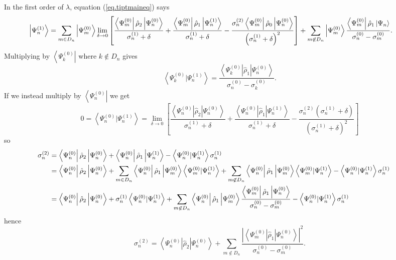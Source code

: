 \documentclass[11pt]{article}
\newcommand{\bra}[1]{\left\langle#1\right|}
\newcommand{\ket}[1]{\left|#1\right\rangle}
\newcommand{\braket}[2]{\left\langle#1|#2\right\rangle}
\newcommand{\op}[1]{\hat{#1}}
\theoremstyle{theorem}
\theoremstyle{remark}
\theoremstyle{step}
\theoremstyle{gap}
\begin{document}
In the first order of \(\lambda\), equation (\ref{eq.tiptmaineq}) says
\[
\hspace{-2.5em}
\ket{\Psi_n^{(1)}} = \sum_{m \in D_n} \ket{\Psi_m^{(0)}} \lim_{\delta \to 0}\left[\frac{\bra{\Psi_m^{(0)}}\op{\rho}_2\ket{\Psi_n^{(0)}}}{\sigma_n^{(1)} + \delta} + \frac{\bra{\Psi_m^{(0)}}\op{\rho}_1\ket{\Psi_n^{(1)}}}{\sigma_n^{(1)} + \delta} - \frac{\sigma_n^{(2)}\bra{\Psi_m^{(0)}}\op{\rho}_0\ket{\Psi_n^{(0)}}}{\left(\sigma_n^{(1)} + \delta\right)^2}\right] 
+ \sum_{m \not\in D_n} \ket{\Psi_m^{(0)}}\frac{\bra{\Psi_m^{(0)}} \op{\rho}_1 \ket{\Psi_n}}{\sigma_n^{(0)} - \sigma_m^{(0)}}.
\]
Multiplying by \(\bra{\Psi_k^{(0)}}\) where \(k \not\in D_n\) gives
\[
\braket{\Psi_k^{(0)}}{\Psi_n^{(1)}} = \frac{\bra{\Psi_k^{(0)}} \op{\rho}_1 \ket{\Psi_n^{(0)}}}{\sigma_n^{(0)}-\sigma_k^{(0)}}.
\]
If we instead multiply by \(\bra{\Psi_n^{(0)}}\) we get
\[
0 = \braket{\Psi_n^{(0)}}{\Psi_n^{(1)}} = \lim_{\delta \to 0} \left[\frac{\bra{\Psi_n^{(0)}}\op{\rho}_2\ket{\Psi_n^{(0)}}}{\sigma_n^{(1)} + \delta} + \frac{\bra{\Psi_n^{(0)}}\op{\rho}_1\ket{\Psi_n^{(1)}}}{\sigma_n^{(1)} + \delta} - \frac{\sigma_n^{(2)}\left(\sigma_n^{(1)}+\delta\right)}{\left(\sigma_n^{(1)} + \delta\right)^2}\right]
\]
so
\begin{align*}
\hspace{-2em}\sigma_n^{(2)} &= \bra{\Psi_n^{(0)}}\op{\rho}_2\ket{\Psi_n^{(0)}} + \bra{\Psi_n^{(0)}}\op{\rho}_1\ket{\Psi_n^{(1)}} - \braket{\Psi_n^{(0)}}{\Psi_n^{(1)}} \sigma_n^{(1)}\\
&= \bra{\Psi_n^{(0)}}\op{\rho}_2\ket{\Psi_n^{(0)}} + \sum_{m \in D_n} \bra{\Psi_n^{(0)}}\op{\rho}_1\ket{\Psi_m^{(0)}}\braket{\Psi_m^{(0)}}{\Psi_n^{(1)}} + \sum_{m \not\in D_n} \bra{\Psi_n^{(0)}}\op{\rho}_1\ket{\Psi_m^{(0)}}\braket{\Psi_m^{(0)}}{\Psi_n^{(1)}} - \braket{\Psi_n^{(0)}}{\Psi_n^{(1)}} \sigma_n^{(1)}\\
&= \bra{\Psi_n^{(0)}}\op{\rho}_2\ket{\Psi_n^{(0)}} + \sigma_n^{(1)}\braket{\Psi_n^{(0)}}{\Psi_n^{(1)}} +  \sum_{m \not\in D_n} \bra{\Psi_n^{(0)}}\op{\rho}_1\ket{\Psi_m^{(0)}}\frac{\bra{\Psi_m^{(0)}} \op{\rho}_1 \ket{\Psi_n^{(0)}}}{\sigma_n^{(0)}-\sigma_m^{(0)}}- \braket{\Psi_n^{(0)}}{\Psi_n^{(1)}} \sigma_n^{(1)}
\end{align*}
hence
\begin{equation}\label{eq.tipt.soval}
\boxed{\sigma_n^{(2)} = \bra{\Psi_n^{(0)}}\op{\rho}_2\ket{\Psi_n^{(0)}} +  \sum_{m \not\in D_n} \frac{\left|\bra{\Psi_m^{(0)}} \op{\rho}_1 \ket{\Psi_n^{(0)}}\right|^2}{\sigma_n^{(0)}-\sigma_m^{(0)}}.}
\end{equation}
\end{document}
